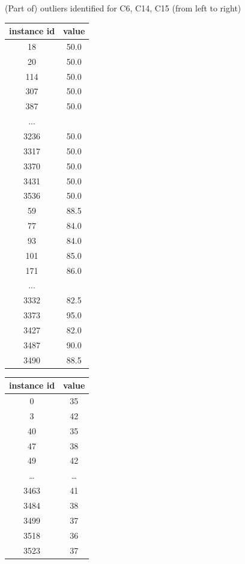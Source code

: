 \documentclass{article}
\begin{document}
\begin{description}
\begin{itemize}
				(Part of) outliers identified for C6, C14, C15 (from left to right)
				\begin{center}
					\begin{tabular}{|c|c|}
						\hline
						instance id & value \\
						\hline
						18      & 50.0 \\
						20      & 50.0 \\
						114     & 50.0 \\
						307     & 50.0 \\
						387     & 50.0 \\
						... & \\ 
						3236    & 50.0 \\
						3317    & 50.0 \\
						3370    & 50.0 \\
						3431    & 50.0 \\
						3536    & 50.0 \\

						59      & 88.5 \\
						77      & 84.0 \\
						93      & 84.0 \\
						101     & 85.0 \\
						171     & 86.0 \\
						...     & \\
						3332    & 82.5 \\
						3373    & 95.0 \\
						3427    & 82.0 \\
						3487    & 90.0 \\ 
						3490    & 88.5 \\
						\hline
					\end{tabular}
					\hfill
					\begin{tabular}{|c|c|}
						\hline
						instance id & value \\
						\hline
						0       & 35 \\
						3       & 42 \\
						40      & 35 \\
						47      & 38 \\
						49      & 42 \\
						\ldots  & \ldots \\
						3463    & 41 \\
						3484    & 38 \\
						3499    & 37 \\
						3518    & 36 \\
						3523    & 37 \\
						\hline


\end{tabular}
\end{center}
\end{itemize}
\end{description}
\end{document}
